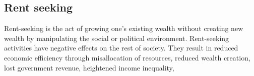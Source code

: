 \subsection{Rent seeking}
  Rent-seeking is the act of growing one's existing wealth without creating new wealth by manipulating the social or political environment. Rent-seeking activities have negative effects on the rest of society. They result in reduced economic efficiency through misallocation of resources, reduced wealth creation, lost government revenue, heightened income inequality,


\color{black}